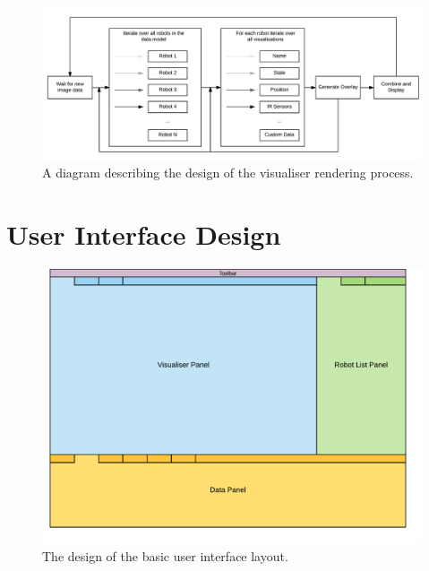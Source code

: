 \begin{figure}[h]
	\centering
	\includegraphics[scale=0.7]{Figures/VisualiserProcess.png}
	\decoRule
	\caption[Visualiser Render Process Design]{A diagram describing the design of the visualiser rendering process.}
	\label{fig:VisualiserProcess}
\end{figure}


\section{User Interface Design} \label{UserInterfaceDesign}
\begin{figure}[h]
	\centering
	\includegraphics[scale=1]{Figures/UILayout.png}
	\decoRule
	\caption[UI Layout]{The design of the basic user interface layout.}
	\label{fig:UILayout}
\end{figure}

